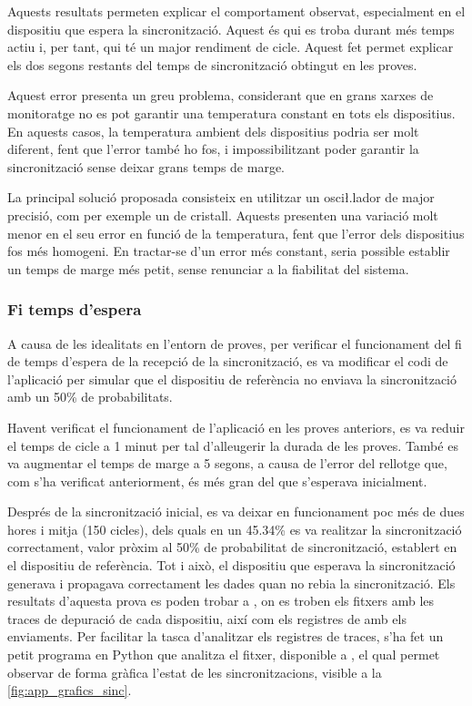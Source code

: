 \documentclass{tfgitic}[2024/07/01]
\begin{document}
{Aquests resultats permeten explicar el comportament observat, especialment en el dispositiu que espera la sincronització. Aquest és qui es troba durant més temps actiu i, per tant, qui té un major rendiment de cicle. Aquest fet permet explicar els dos segons restants del temps de sincronització obtingut en les proves.

Aquest error presenta un greu problema, considerant que en grans xarxes de monitoratge no es pot garantir una temperatura constant en tots els dispositius. En aquests casos, la temperatura ambient dels dispositius podria ser molt diferent, fent que l'error també ho fos, i impossibilitzant poder garantir la sincronització sense deixar grans temps de marge.

La principal solució proposada consisteix en utilitzar un osci\l.lador de major precisió, com per exemple un de cristall. Aquests presenten una variació molt menor en el seu error en funció de la temperatura, fent que l'error dels dispositius fos més homogeni. En tractar-se d'un error més constant, seria possible establir un temps de marge més petit, sense renunciar a la fiabilitat del sistema.

\subsubsection{Fi temps d'espera}
A causa de les idealitats en l'entorn de proves, per verificar el funcionament del fi de temps d'espera de la recepció de la sincronització, es va modificar el codi de l'aplicació per simular que el dispositiu de referència no enviava la sincronització amb un 50\% de probabilitats. 

Havent verificat el funcionament de l'aplicació en les proves anteriors, es va reduir el temps de cicle a 1 minut per tal d'alleugerir la durada de les proves. També es va augmentar el temps de marge a 5 segons, a causa de l'error del rellotge que, com s'ha verificat anteriorment, és més gran del que s'esperava inicialment.

Després de la sincronització inicial, es va deixar en funcionament poc més de dues hores i mitja (150 cicles), dels quals en un 45.34\% es va realitzar la sincronització correctament, valor pròxim al 50\% de probabilitat de sincronització, establert en el dispositiu de referència. Tot i això, el dispositiu que esperava la sincronització generava i propagava correctament les dades quan no rebia la sincronització. Els resultats d'aquesta prova es poden trobar a , on es troben els fitxers amb les traces de depuració de cada dispositiu, així com els registres de  amb els enviaments. Per facilitar la tasca d'analitzar els registres de traces, s'ha fet un petit programa en Python que analitza el fitxer, disponible a , el qual permet observar de forma gràfica l'estat de les sincronitzacions, visible a la \autoref{fig:app_grafics_sinc}.

}
\end{document}
